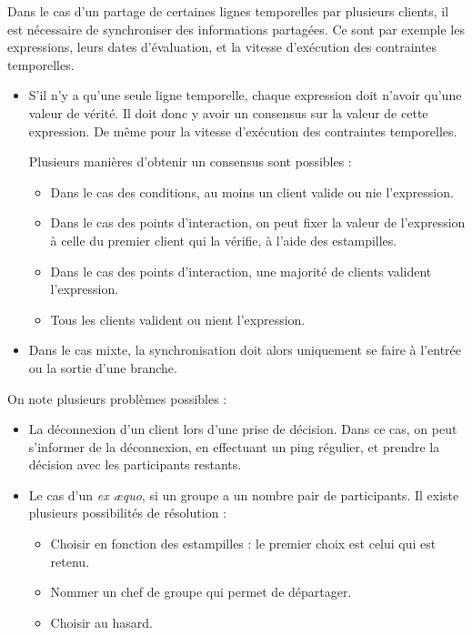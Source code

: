 \documentclass[10pt]{article}
\begin{document}
Dans le cas d'un partage de certaines lignes temporelles par plusieurs clients, il est nécessaire de synchroniser des informations partagées.
Ce sont par exemple les expressions, leurs dates d'évaluation, et la vitesse d'exécution des contraintes temporelles.

\begin{itemize}
	\item S'il n'y a qu'une seule ligne temporelle, chaque expression doit n'avoir qu'une valeur de vérité. 
    Il doit donc y avoir un consensus sur la valeur de cette expression. 
    De même pour la vitesse d'exécution des contraintes temporelles.
    
    Plusieurs manières d'obtenir un consensus sont possibles : 
    \begin{itemize}
        \item Dans le cas des conditions, au moins un client valide ou nie l'expression. 
        \item Dans le cas des points d'interaction, on peut fixer la valeur de l'expression à celle du premier client qui la vérifie, à l'aide des estampilles. %
        \item Dans le cas des points d'interaction, une majorité de clients valident l'expression.
        \item Tous les clients valident ou nient l'expression.
    \end{itemize}

	\item Dans le cas mixte, la synchronisation doit alors uniquement se faire à l'entrée ou la sortie d'une branche.
\end{itemize}

On note plusieurs problèmes possibles : 
\begin{itemize}
    \item La déconnexion d'un client lors d'une prise de décision. 
    Dans ce cas, on peut s'informer de la déconnexion, en effectuant un ping régulier, et prendre la décision avec les participants restants. 
    \item Le cas d'un \textit{ex æquo}, si un groupe a un nombre pair de participants.
    Il existe plusieurs possibilités de résolution : 
    \begin{itemize}
        \item Choisir en fonction des estampilles : le premier choix est celui qui est retenu.
        \item Nommer un chef de groupe qui permet de départager.
        \item Choisir au hasard.
    \end{itemize}
\end{itemize}
\end{document}
